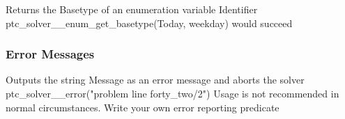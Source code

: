 \documentclass{article}
\begin{document}
        {Returns the Basetype of an enumeration variable Identifier}
        {ptc\_solver\_\_enum\_get\_basetype(Today, weekday) would succeed}
        {}

\subsubsection{Error Messages}

\hspace{\parindent}
        {Outputs the string Message as an error message and aborts the solver}
        {ptc\_solver\_\_error("problem line forty\_two/2")}
        {Usage is not recommended in normal circumstances. Write your own error
reporting predicate}




\end{document}

